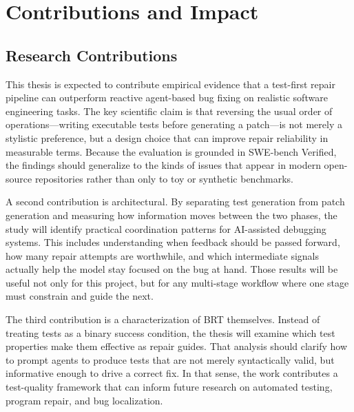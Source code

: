 \documentclass[12pt]{article}
\begin{document}



\section{Contributions and Impact}

\subsection{Research Contributions}

This thesis is expected to contribute empirical evidence that a test-first repair pipeline can outperform reactive agent-based bug fixing on realistic software engineering tasks. The key scientific claim is that reversing the usual order of operations---writing executable tests before generating a patch---is not merely a stylistic preference, but a design choice that can improve repair reliability in measurable terms. Because the evaluation is grounded in SWE-bench Verified, the findings should generalize to the kinds of issues that appear in modern open-source repositories rather than only to toy or synthetic benchmarks.

A second contribution is architectural. By separating test generation from patch generation and measuring how information moves between the two phases, the study will identify practical coordination patterns for AI-assisted debugging systems. This includes understanding when feedback should be passed forward, how many repair attempts are worthwhile, and which intermediate signals actually help the model stay focused on the bug at hand. Those results will be useful not only for this project, but for any multi-stage workflow where one stage must constrain and guide the next.

The third contribution is a characterization of BRT themselves. Instead of treating tests as a binary success condition, the thesis will examine which test properties make them effective as repair guides. That analysis should clarify how to prompt agents to produce tests that are not merely syntactically valid, but informative enough to drive a correct fix. In that sense, the work contributes a test-quality framework that can inform future research on automated testing, program repair, and bug localization.
\end{document}
